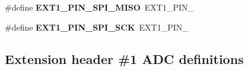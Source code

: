 \begin{DoxyCompactItemize}
\item 
\hypertarget{group__saml21__xplained__pro__features__group_ga42c2670222e6139cb2440d5eac145a24}{}\#define {\bfseries E\+X\+T1\+\_\+\+P\+I\+N\+\_\+\+S\+P\+I\+\_\+\+M\+I\+S\+O}~E\+X\+T1\+\_\+\+P\+I\+N\+\_\label{group__saml21__xplained__pro__features__group_ga42c2670222e6139cb2440d5eac145a24}

\item 
\hypertarget{group__saml21__xplained__pro__features__group_gaa9c530476b2cb1e78323b367139e45f2}{}\#define {\bfseries E\+X\+T1\+\_\+\+P\+I\+N\+\_\+\+S\+P\+I\+\_\+\+S\+C\+K}~E\+X\+T1\+\_\+\+P\+I\+N\+\_\label{group__saml21__xplained__pro__features__group_gaa9c530476b2cb1e78323b367139e45f2}

\end{DoxyCompactItemize}
\subsection*{Extension header \#1 A\+D\+C definitions}
